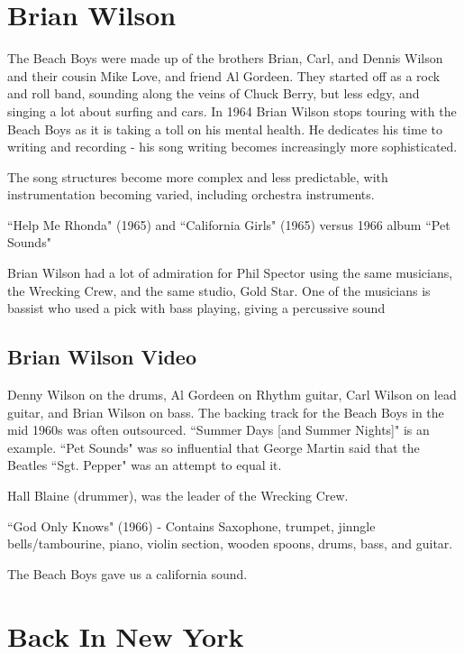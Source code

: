 \documentclass[12pt, a4paper, twoside, openright, titlepage]{book}
\begin{document}
\section{Brian Wilson}

The Beach Boys were made up of the brothers Brian, Carl, and Dennis Wilson and their cousin Mike Love, and friend Al Gordeen. They started off as a rock and roll band, sounding along the veins of Chuck Berry, but less edgy, and singing a lot about surfing and cars. In 1964 Brian Wilson stops touring with the Beach Boys as it is taking a toll on his mental health. He dedicates his time to writing and recording - his song writing becomes increasingly more sophisticated. 

The song structures become more complex and less predictable, with instrumentation becoming varied, including orchestra instruments.

\begin{eg}{}{}
    ``Help Me Rhonda" (1965) and ``California Girls" (1965) versus 1966 album ``Pet Sounds"
\end{eg}

Brian Wilson had a lot of admiration for Phil Spector using the same musicians, the Wrecking Crew, and the same studio, Gold Star. One of the musicians is bassist  who used a pick with bass playing, giving a percussive sound

\subsection{Brian Wilson Video}

Denny Wilson on the drums, Al Gordeen on Rhythm guitar, Carl Wilson on lead guitar, and Brian Wilson on bass. The backing track for the Beach Boys in the mid 1960s was often outsourced. ``Summer Days [and Summer Nights]" is an example. ``Pet Sounds" was so influential that George Martin said that the Beatles ``Sgt. Pepper" was an attempt to equal it.

Hall Blaine (drummer), was the leader of the Wrecking Crew.

\begin{eg}{}{}
    ``God Only Knows" (1966) - Contains Saxophone, trumpet, jinngle bells/tambourine, piano, violin section, wooden spoons, drums, bass, and guitar.
\end{eg}


The Beach Boys gave us a california sound.


\section{Back In New York}
\end{document}
